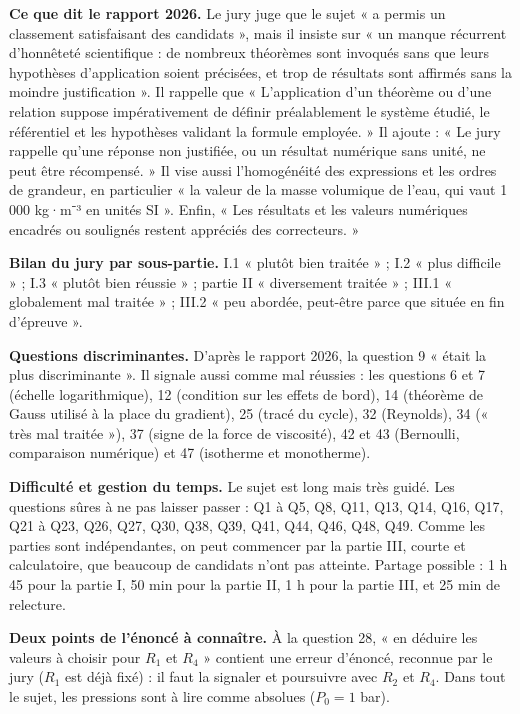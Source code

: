 \documentclass[11pt,a4paper]{article}
\begin{document}
\textbf{Ce que dit le rapport 2026.} Le jury juge que le sujet « a permis un classement satisfaisant des candidats », mais il insiste sur « un manque récurrent d'honnêteté scientifique : de nombreux théorèmes sont invoqués sans que leurs hypothèses d'application soient précisées, et trop de résultats sont affirmés sans la moindre justification ». Il rappelle que « L'application d'un théorème ou d'une relation suppose impérativement de définir préalablement le système étudié, le référentiel et les hypothèses validant la formule employée. » Il ajoute : « Le jury rappelle qu'une réponse non justifiée, ou un résultat numérique sans unité, ne peut être récompensé. » Il vise aussi l'homogénéité des expressions et les ordres de grandeur, en particulier « la valeur de la masse volumique de l'eau, qui vaut 1 000 kg·m⁻³ en unités SI ». Enfin, « Les résultats et les valeurs numériques encadrés ou soulignés restent appréciés des correcteurs. »

\textbf{Bilan du jury par sous-partie.} I.1 « plutôt bien traitée » ; I.2 « plus difficile » ; I.3 « plutôt bien réussie » ; partie II « diversement traitée » ; III.1 « globalement mal traitée » ; III.2 « peu abordée, peut-être parce que située en fin d'épreuve ».

\textbf{Questions discriminantes.} D'après le rapport 2026, la question 9 « était la plus discriminante ». Il signale aussi comme mal réussies : les questions 6 et 7 (échelle logarithmique), 12 (condition sur les effets de bord), 14 (théorème de Gauss utilisé à la place du gradient), 25 (tracé du cycle), 32 (Reynolds), 34 (« très mal traitée »), 37 (signe de la force de viscosité), 42 et 43 (Bernoulli, comparaison numérique) et 47 (isotherme et monotherme).

\textbf{Difficulté et gestion du temps.} Le sujet est long mais très guidé. Les questions sûres à ne pas laisser passer : Q1 à Q5, Q8, Q11, Q13, Q14, Q16, Q17, Q21 à Q23, Q26, Q27, Q30, Q38, Q39, Q41, Q44, Q46, Q48, Q49. Comme les parties sont indépendantes, on peut commencer par la partie III, courte et calculatoire, que beaucoup de candidats n'ont pas atteinte. Partage possible : 1 h 45 pour la partie I, 50 min pour la partie II, 1 h pour la partie III, et 25 min de relecture.

\textbf{Deux points de l'énoncé à connaître.} À la question 28, « en déduire les valeurs à choisir pour \(R_1\) et \(R_4\) » contient une erreur d'énoncé, reconnue par le jury (\(R_1\) est déjà fixé) : il faut la signaler et poursuivre avec \(R_2\) et \(R_4\). Dans tout le sujet, les pressions sont à lire comme absolues (\(P_0=1\) bar).
\end{document}
